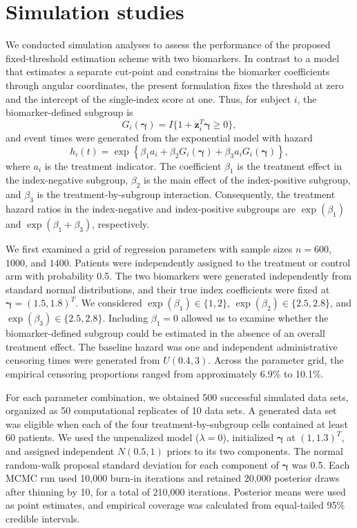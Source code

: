 \section{Simulation studies}
\label{simuStudy}

We conducted simulation analyses to assess the performance of the proposed
fixed-threshold estimation scheme with two biomarkers. In contrast to a model
that estimates a separate cut-point and constrains the biomarker coefficients
through angular coordinates, the present formulation fixes the threshold at
zero and the intercept of the single-index score at one. Thus, for subject
$i$, the biomarker-defined subgroup is
\[
    G_i(\boldsymbol\gamma)
    = I\{1+\mathbf{z}_i^{T}\boldsymbol\gamma\geq 0\},
\]
and event times were generated from the exponential model with hazard
\begin{equation}
\label{eq:simModelFixedThreshold}
    h_i(t)
    = \exp\left\{
        \beta_1 a_i
        + \beta_2 G_i(\boldsymbol\gamma)
        + \beta_3 a_iG_i(\boldsymbol\gamma)
      \right\},
\end{equation}
where $a_i$ is the treatment indicator. The coefficient $\beta_1$ is the
treatment effect in the index-negative subgroup, $\beta_2$ is the main effect
of the index-positive subgroup, and $\beta_3$ is the treatment-by-subgroup
interaction. Consequently, the treatment hazard ratios in the index-negative
and index-positive subgroups are $\exp(\beta_1)$ and
$\exp(\beta_1+\beta_3)$, respectively.

We first examined a grid of regression parameters with sample sizes
$n=600$, $1000$, and $1400$. Patients were independently assigned to the
treatment or control arm with probability 0.5. The two biomarkers were
generated independently from standard normal distributions, and their true
index coefficients were fixed at
$\boldsymbol\gamma=(1.5,1.8)^{T}$. We considered
$\exp(\beta_1)\in\{1,2\}$,
$\exp(\beta_2)\in\{2.5,2.8\}$, and
$\exp(\beta_3)\in\{2.5,2.8\}$. Including $\beta_1=0$ allowed us to examine
whether the biomarker-defined subgroup could be estimated in the absence of
an overall treatment effect. The baseline hazard was one and independent
administrative censoring times were generated from $U(0.4,3)$. Across the
parameter grid, the empirical censoring proportions ranged from approximately
6.9\% to 10.1\%.

For each parameter combination, we obtained 500 successful simulated data
sets, organized as 50 computational replicates of 10 data sets. A generated
data set was eligible when each of the four treatment-by-subgroup cells
contained at least 60 patients. We used the unpenalized model
($\lambda=0$), initialized $\boldsymbol\gamma$ at $(1,1.3)^{T}$, and assigned
independent $N(0.5,1)$ priors to its two components. The normal random-walk
proposal standard deviation for each component of $\boldsymbol\gamma$ was
0.5. Each MCMC run used 10,000 burn-in iterations and retained 20,000
posterior draws after thinning by 10, for a total of 210,000 iterations.
Posterior means were used as point estimates, and empirical coverage was
calculated from equal-tailed 95\% credible intervals.

